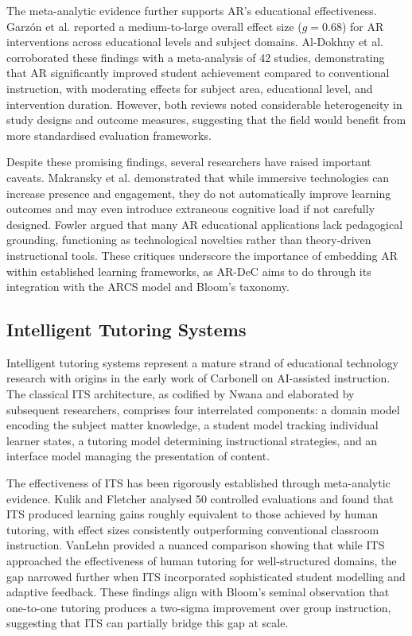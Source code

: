 The meta-analytic evidence further supports AR's educational effectiveness. Garz\'{o}n et al. \cite{garzonybarragan2020} reported a medium-to-large overall effect size ($g = 0.68$) for AR interventions across educational levels and subject domains. Al-Dokhny et al. \cite{aldokhny2022} corroborated these findings with a meta-analysis of 42 studies, demonstrating that AR significantly improved student achievement compared to conventional instruction, with moderating effects for subject area, educational level, and intervention duration. However, both reviews noted considerable heterogeneity in study designs and outcome measures, suggesting that the field would benefit from more standardised evaluation frameworks.

Despite these promising findings, several researchers have raised important caveats. Makransky et al. \cite{makransky2019} demonstrated that while immersive technologies can increase presence and engagement, they do not automatically improve learning outcomes and may even introduce extraneous cognitive load if not carefully designed. Fowler \cite{fowler2015} argued that many AR educational applications lack pedagogical grounding, functioning as technological novelties rather than theory-driven instructional tools. These critiques underscore the importance of embedding AR within established learning frameworks, as AR-DeC aims to do through its integration with the ARCS model and Bloom's taxonomy.

\subsection{Intelligent Tutoring Systems}
\label{subsec:its}

Intelligent tutoring systems represent a mature strand of educational technology research with origins in the early work of Carbonell \cite{carbonell1970} on AI-assisted instruction. The classical ITS architecture, as codified by Nwana \cite{nwana1990} and elaborated by subsequent researchers, comprises four interrelated components: a domain model encoding the subject matter knowledge, a student model tracking individual learner states, a tutoring model determining instructional strategies, and an interface model managing the presentation of content.

The effectiveness of ITS has been rigorously established through meta-analytic evidence. Kulik and Fletcher \cite{kulik2016} analysed 50 controlled evaluations and found that ITS produced learning gains roughly equivalent to those achieved by human tutoring, with effect sizes consistently outperforming conventional classroom instruction. VanLehn \cite{vanlehn2011} provided a nuanced comparison showing that while ITS approached the effectiveness of human tutoring for well-structured domains, the gap narrowed further when ITS incorporated sophisticated student modelling and adaptive feedback. These findings align with Bloom's \cite{bloom1984} seminal observation that one-to-one tutoring produces a two-sigma improvement over group instruction, suggesting that ITS can partially bridge this gap at scale.

